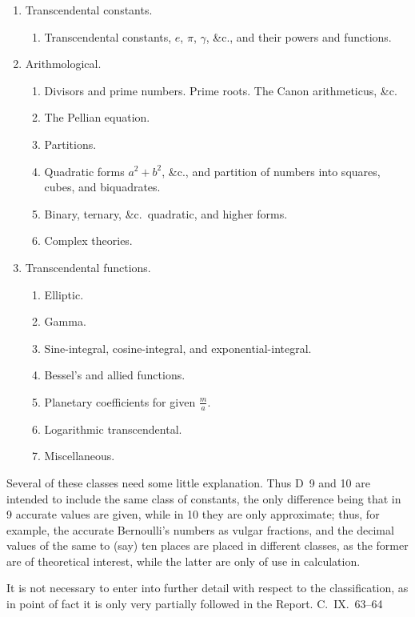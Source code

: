 \documentclass[11pt,a4paper]{book}
\begin{document}
{\begin{enumerate}[label=\Alph*.]
\item Transcendental constants.
\begin{enumerate}[label=\arabic*., resume]
\item Transcendental constants, $e$, $\pi$, $\gamma$, \&c., and their powers and functions.
\end{enumerate}

\item Arithmological.
\begin{enumerate}[label=\arabic*., resume]
\item Divisors and prime numbers. Prime roots. The Canon arithmeticus, \&c.
\item The Pellian equation.
\item Partitions.
\item Quadratic forms $a^2 + b^2$, \&c., and partition of numbers into squares, cubes, and biquadrates.
\item Binary, ternary, \&c.\ quadratic, and higher forms.
\item Complex theories.
\end{enumerate}

\item Transcendental functions.
\begin{enumerate}[label=\arabic*., resume]
\item Elliptic.
\item Gamma.
\item Sine-integral, cosine-integral, and exponential-integral.
\item Bessel's and allied functions.
\item Planetary coefficients for given $\frac{m}{a}$.
\item Logarithmic transcendental.
\item Miscellaneous.
\end{enumerate}
\end{enumerate}

Several of these classes need some little explanation. Thus D~9 and 10 are intended to include the same class of constants, the only difference being that in 9 accurate values are given, while in 10 they are only approximate; thus, for example, the accurate Bernoulli's numbers as vulgar fractions, and the decimal values of the same to (say) ten places are placed in different classes, as the former are of theoretical interest, while the latter are only of use in calculation.

It is not necessary to enter into further detail with respect to the classification, as in point of fact it is only very partially followed in the Report.
\hfill C.~IX.\ 63--64

} %
\end{document}
